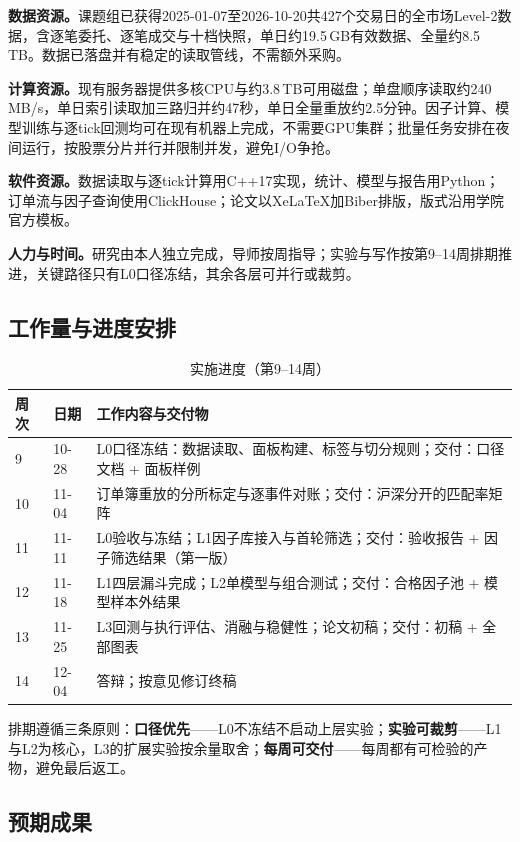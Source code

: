 \documentclass[11pt,a4paper]{article}
\begin{document}
\textbf{数据资源。}课题组已获得2025-01-07至2026-10-20共427个交易日的全市场Level-2数据，含逐笔委托、逐笔成交与十档快照，单日约19.5\,GB有效数据、全量约8.5\,TB。数据已落盘并有稳定的读取管线，不需额外采购。

\textbf{计算资源。}现有服务器提供多核CPU与约3.8\,TB可用磁盘；单盘顺序读取约240\,MB/s，单日索引读取加三路归并约47秒，单日全量重放约2.5分钟。因子计算、模型训练与逐tick回测均可在现有机器上完成，不需要GPU集群；批量任务安排在夜间运行，按股票分片并行并限制并发，避免I/O争抢。

\textbf{软件资源。}数据读取与逐tick计算用C++17实现，统计、模型与报告用Python；订单流与因子查询使用ClickHouse；论文以XeLaTeX加Biber排版，版式沿用学院官方模板。

\textbf{人力与时间。}研究由本人独立完成，导师按周指导；实验与写作按第9--14周排期推进，关键路径只有L0口径冻结，其余各层可并行或裁剪。

\subsection*{工作量与进度安排}

\begin{table}
  \caption{实施进度（第9--14周）}
  \begin{tabular}{lll}
    \toprule
    周次 & 日期 & 工作内容与交付物 \\
    \midrule
    9 & 10-28 & L0口径冻结：数据读取、面板构建、标签与切分规则；交付：口径文档 + 面板样例 \\
    10 & 11-04 & 订单簿重放的分所标定与逐事件对账；交付：沪深分开的匹配率矩阵 \\
    11 & 11-11 & L0验收与冻结；L1因子库接入与首轮筛选；交付：验收报告 + 因子筛选结果（第一版） \\
    12 & 11-18 & L1四层漏斗完成；L2单模型与组合测试；交付：合格因子池 + 模型样本外结果 \\
    13 & 11-25 & L3回测与执行评估、消融与稳健性；论文初稿；交付：初稿 + 全部图表 \\
    14 & 12-04 & 答辩；按意见修订终稿 \\
    \bottomrule
  \end{tabular}
\end{table}

排期遵循三条原则：\textbf{口径优先}——L0不冻结不启动上层实验；\textbf{实验可裁剪}——L1与L2为核心，L3的扩展实验按余量取舍；\textbf{每周可交付}——每周都有可检验的产物，避免最后返工。

\subsection*{预期成果}
\end{document}
